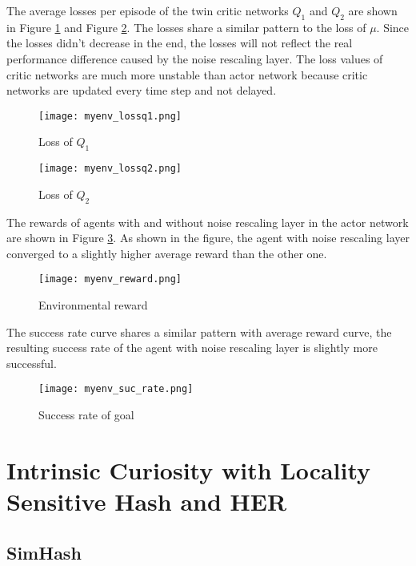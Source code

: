 \documentclass[a4paper, 12pt]{report}
\begin{document}
    The average losses per episode of the twin critic networks $Q_1$ and $Q_2$ are shown in Figure \ref{fcn_lossq1} and Figure \ref{fcn_lossq2}. The losses share a similar pattern to the loss of $\mu$. Since the losses didn't decrease in the end, the losses will not reflect the real performance difference caused by the noise rescaling layer. The loss values of critic networks are much more unstable than actor network because critic networks are updated every time step and not delayed.

        \begin{figure}[H]
        \centering
        \texttt{[image: myenv\_lossq1.png]}
        \caption{Loss of $Q_1$}
            \label{fcn_lossq1}
        \end{figure}

        \begin{figure}[H]
        \centering
        \texttt{[image: myenv\_lossq2.png]}
        \caption{Loss of $Q_2$}
            \label{fcn_lossq2}
        \end{figure}

    The rewards of agents with and without noise rescaling layer in the actor network are shown in Figure \ref{fcn_reward}. As shown in the figure, the agent with noise rescaling layer converged to a slightly higher average reward than the other one.

        \begin{figure}[H]
        \centering
        \texttt{[image: myenv\_reward.png]}
        \caption{Environmental reward}
            \label{fcn_reward}
        \end{figure}

    The success rate curve shares a similar pattern with average reward curve, the resulting success rate of the agent with noise rescaling layer is slightly more successful.

        \begin{figure}[H]
        \centering
        \texttt{[image: myenv\_suc\_rate.png]}
        \caption{Success rate of goal}
            \label{fcn_suc_rate}
        \end{figure}


\chapter {Intrinsic Curiosity with Locality Sensitive Hash and HER}

    \section{SimHash}
\end{document}
